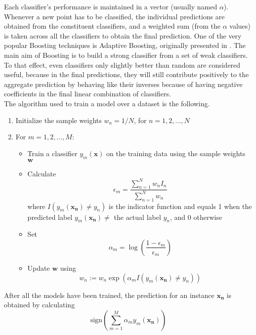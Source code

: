 Each classifier's performance is maintained in a vector (usually named $\alpha$). Whenever a new point has to be classified, the individual predictions are obtained from the constituent classifiers, and a weighted sum (from the $\alpha$ values) is taken across all the classifiers to obtain the final prediction. One of the very popular Boosting techniques is Adaptive Boosting, originally presented in \cite{freund1995desicion}. The main aim of Boosting is to build a strong classifier from a set of weak classifiers. To that effect, even classifiers only slightly better than random are considered useful, because in the final predictions, they will still contribute positively to the aggregate prediction by behaving like their inverses because of having negative coefficients in the final linear combination of classifiers.\\

The algorithm used to train a model over a dataset is the following.

\begin{enumerate}
    \item{Initialize the sample weights $w_n = 1/N$, for $n = 1, 2, ..., N$}
    \item{
    For $m = 1, 2, ..., M$:
    \begin{itemize}
        \item{Train a classifier $y_m(\mathbf{x})$ on the training data using the sample weights $\mathbf{w}$}
        \item{Calculate $$\epsilon_m = \frac{\displaystyle \sum_{n = 1}^{N} w_n I_n}{\displaystyle \sum_{n = 1}^{N} w_n}$$ where $I(y_m(\mathbf{x_n}) \neq y_n)$ is the indicator function and equals 1 when the predicted label $y_m(\mathbf{x_n}) \neq$ the actual label $y_n$, and 0 otherwise}
        \item{Set $$\alpha_m = \log(\frac{1 - \epsilon_m}{\epsilon_m})$$}
        \item{Update $\mathbf{w}$ using $$w_n := w_n \exp(\alpha_m I(y_m(\mathbf{x_n}) \neq y_n))$$}
    \end{itemize}
    }
\end{enumerate}

After all the models have been trained, the prediction for an instance $\mathbf{x_n}$ is obtained by calculating $$\mathrm{sign}(\displaystyle \sum_{m = 1}^{M} \alpha_m y_m(\mathbf{x_n}))$$

